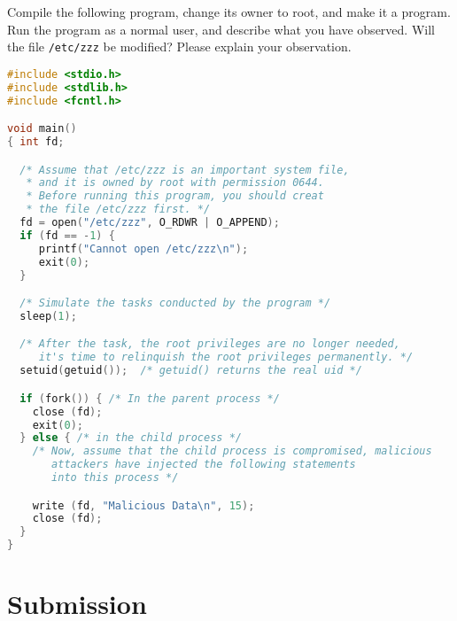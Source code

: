 Compile the following program, change its owner to root, and
make it a \setuid program. Run the program as a normal user,
and describe what you have observed.
Will the file {\tt /etc/zzz} be modified? Please explain
your observation.

\begin{lstlisting}[language=C]
#include <stdio.h>
#include <stdlib.h>
#include <fcntl.h>

void main()
{ int fd;

  /* Assume that /etc/zzz is an important system file,
   * and it is owned by root with permission 0644.
   * Before running this program, you should creat
   * the file /etc/zzz first. */
  fd = open("/etc/zzz", O_RDWR | O_APPEND);
  if (fd == -1) {
     printf("Cannot open /etc/zzz\n");
     exit(0);
  }

  /* Simulate the tasks conducted by the program */
  sleep(1);

  /* After the task, the root privileges are no longer needed,
     it's time to relinquish the root privileges permanently. */
  setuid(getuid());  /* getuid() returns the real uid */

  if (fork()) { /* In the parent process */
    close (fd);
    exit(0);
  } else { /* in the child process */
    /* Now, assume that the child process is compromised, malicious
       attackers have injected the following statements
       into this process */

    write (fd, "Malicious Data\n", 15);
    close (fd);
  }
}
\end{lstlisting}




\section{Submission}





